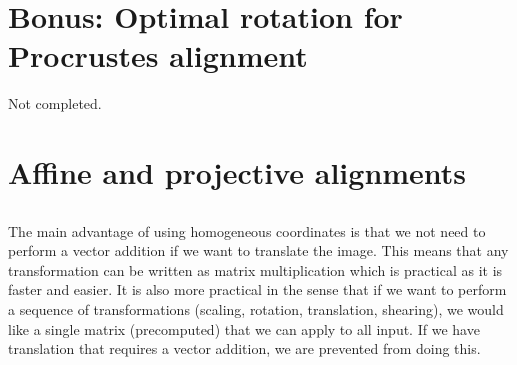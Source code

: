 \documentclass[a4paper]{article}
\begin{document}
\section{Bonus: Optimal rotation for Procrustes alignment}
Not completed.

\section{Affine and projective alignments}
\subsection{}
The main advantage of using homogeneous coordinates is that we not need to perform a vector addition if we want to translate the image. This means that any transformation can be written as matrix multiplication which is practical as it is faster and easier. It is also more practical in the sense that if we want to perform a sequence of transformations (scaling, rotation, translation, shearing), we would like a single matrix (precomputed) that we can apply to all input. If we have translation that requires a vector addition, we are prevented from doing this.
\end{document}
